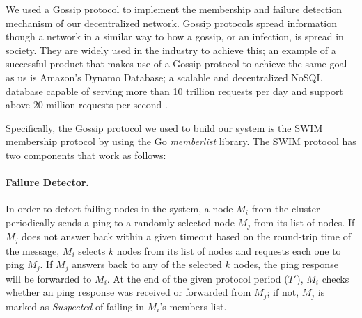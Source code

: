 We used a Gossip protocol to implement the membership and failure detection mechanism of our decentralized network. Gossip protocols spread information though a network in a similar way to how a gossip, or an infection, is spread in society. They are widely used in the industry to achieve this; an example of a successful product that makes use of a Gossip protocol to achieve the same goal as us is Amazon's Dynamo Database\cite{dynamo_paper}; a scalable and decentralized NoSQL database capable of serving more than 10 trillion requests per day and support above 20 million requests per second \cite{dynamo_web}.

Specifically, the Gossip protocol we used to build our system is the SWIM membership protocol\cite{SWIM} by using the Go \textit{memberlist} library\cite{memberlist}. The SWIM protocol has two components that work as follows\cite{SWIM}:

\paragraph*{Failure Detector.} In order to detect failing nodes in the system, a node $M_{i}$ from the cluster periodically sends a ping to a randomly selected node $M_{j}$ from its list of nodes. If $M_{j}$ does not answer back within a given timeout based on the round-trip time of the message, $M_{i}$ selects $k$ nodes from its list of nodes and requests each one to ping $M_{j}$. If $M_{j}$ answers back to any of the selected $k$ nodes, the ping response will be forwarded to $M_{i}$. At the end of the given protocol period ($T'$), $M_{i}$ checks whether an ping response was received or forwarded from $M_{j}$; if not, $M_{j}$ is marked as \textit{Suspected} of failing in $M_{i}$'s members list.

